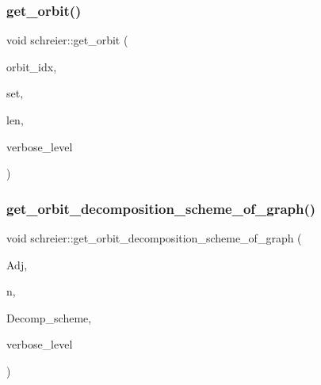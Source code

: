 \subsubsection{\texorpdfstring{get\+\_\+orbit()}{get\_orbit()}}
{\footnotesize\ttfamily void schreier\+::get\+\_\+orbit (\begin{DoxyParamCaption}\item[{\mbox{\hyperlink{galois_8h_a09fddde158a3a20bd2dcadb609de11dc}{I\+NT}}}]{orbit\+\_\+idx,  }\item[{\mbox{\hyperlink{galois_8h_a09fddde158a3a20bd2dcadb609de11dc}{I\+NT}} $\ast$}]{set,  }\item[{\mbox{\hyperlink{galois_8h_a09fddde158a3a20bd2dcadb609de11dc}{I\+NT}} \&}]{len,  }\item[{\mbox{\hyperlink{galois_8h_a09fddde158a3a20bd2dcadb609de11dc}{I\+NT}}}]{verbose\+\_\+level }\end{DoxyParamCaption})}

\mbox{\label{classschreier_afe5e69fc0b320432e9d93e94853b22d2}} 
\subsubsection{\texorpdfstring{get\+\_\+orbit\+\_\+decomposition\+\_\+scheme\+\_\+of\+\_\+graph()}{get\_orbit\_decomposition\_scheme\_of\_graph()}}
{\footnotesize\ttfamily void schreier\+::get\+\_\+orbit\+\_\+decomposition\+\_\+scheme\+\_\+of\+\_\+graph (\begin{DoxyParamCaption}\item[{\mbox{\hyperlink{galois_8h_a09fddde158a3a20bd2dcadb609de11dc}{I\+NT}} $\ast$}]{Adj,  }\item[{\mbox{\hyperlink{galois_8h_a09fddde158a3a20bd2dcadb609de11dc}{I\+NT}}}]{n,  }\item[{\mbox{\hyperlink{galois_8h_a09fddde158a3a20bd2dcadb609de11dc}{I\+NT}} $\ast$\&}]{Decomp\+\_\+scheme,  }\item[{\mbox{\hyperlink{galois_8h_a09fddde158a3a20bd2dcadb609de11dc}{I\+NT}}}]{verbose\+\_\+level }\end{DoxyParamCaption})}

\mbox{\label{classschreier_a9f86e98688bf04c7210ccba5ffe23bd7}} 
